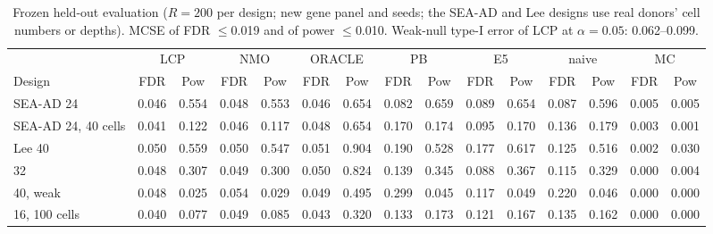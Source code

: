 \begin{table}[t]\centering\footnotesize\setlength{\tabcolsep}{2.5pt}
\caption{Frozen held-out evaluation ($R=200$ per design; new gene panel and seeds; the SEA-AD and Lee designs use real donors' cell numbers or depths). MCSE of FDR $\le$0.019 and of power $\le$0.010. Weak-null type-I error of LCP at $\alpha=0.05$: 0.062--0.099.}\label{tab:heldout}
\begin{tabular}{lcccccccccccccc}
\toprule
& \multicolumn{2}{c}{LCP} & \multicolumn{2}{c}{NMO} & \multicolumn{2}{c}{ORACLE} & \multicolumn{2}{c}{PB} & \multicolumn{2}{c}{E5} & \multicolumn{2}{c}{naive} & \multicolumn{2}{c}{MC} \\
Design & FDR & Pow & FDR & Pow & FDR & Pow & FDR & Pow & FDR & Pow & FDR & Pow & FDR & Pow \\
\midrule
SEA-AD 24 & 0.046 & 0.554 & 0.048 & 0.553 & 0.046 & 0.654 & 0.082 & 0.659 & 0.089 & 0.654 & 0.087 & 0.596 & 0.005 & 0.005 \\
SEA-AD 24, 40 cells & 0.041 & 0.122 & 0.046 & 0.117 & 0.048 & 0.654 & 0.170 & 0.174 & 0.095 & 0.170 & 0.136 & 0.179 & 0.003 & 0.001 \\
Lee 40 & 0.050 & 0.559 & 0.050 & 0.547 & 0.051 & 0.904 & 0.190 & 0.528 & 0.177 & 0.617 & 0.125 & 0.516 & 0.002 & 0.030 \\
32 & 0.048 & 0.307 & 0.049 & 0.300 & 0.050 & 0.824 & 0.139 & 0.345 & 0.088 & 0.367 & 0.115 & 0.329 & 0.000 & 0.004 \\
40, weak & 0.048 & 0.025 & 0.054 & 0.029 & 0.049 & 0.495 & 0.299 & 0.045 & 0.117 & 0.049 & 0.220 & 0.046 & 0.000 & 0.000 \\
16, 100 cells & 0.040 & 0.077 & 0.049 & 0.085 & 0.043 & 0.320 & 0.133 & 0.173 & 0.121 & 0.167 & 0.135 & 0.162 & 0.000 & 0.000 \\
\bottomrule
\end{tabular}
\end{table}
